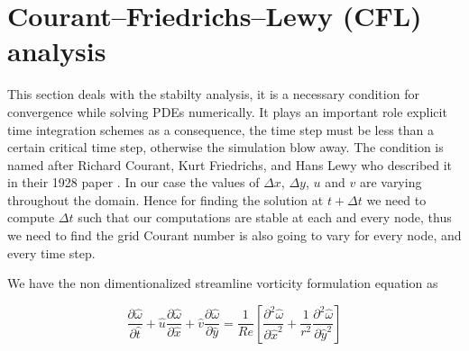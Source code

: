 \documentclass{article}
\begin{document}
\section{Courant–Friedrichs–Lewy (CFL) analysis}
This section deals with the stabilty analysis, it is a necessary condition for convergence while solving PDEs numerically. It plays an important role explicit time integration schemes as a consequence, the time step must be less than a certain critical time step, otherwise the simulation blow away. The condition is named after Richard Courant, Kurt Friedrichs, and Hans Lewy who described it in their 1928 paper \citep{cfl}.
In our case the values of $\Delta x$, $\Delta y$, $u$ and $v$ are varying throughout the domain. Hence for finding the solution at $t+\Delta t$ we need to compute $\Delta t$ such that our computations are stable at each and every node, thus we need to find the grid Courant number is also going to vary for every node, and every time step. 

We have the non dimentionalized streamline vorticity formulation equation as

\begin{equation}
\frac{\partial \hat{\omega}}{\partial \hat{t}} + \hat{u}\frac{\partial \hat{\omega}}{\partial \hat{x}} +\hat{ v}\frac{\partial \hat{\omega}}{\partial \hat{y}}= \frac{1}{Re} \left [ \frac{\partial^2 \hat{\omega}}{\partial \hat{x}^2} +  \frac{1}{r^2}\frac{\partial^2 \hat{\omega}}{\partial \hat{y}^2} \right ]
\end{equation}
\end{document}

